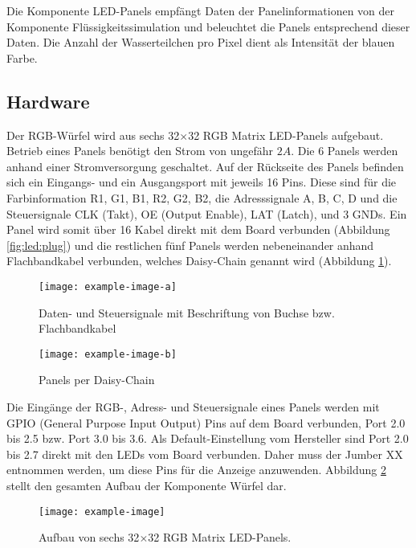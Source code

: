 Die Komponente LED-Panels empfängt Daten der Panelinformationen von der Komponente Flüssigkeitssimulation und beleuchtet die Panels entsprechend dieser Daten. Die Anzahl der Wasserteilchen pro Pixel dient als Intensität der blauen Farbe.

\subsection{Hardware}
Der RGB-Würfel wird aus sechs 32$\times$32 RGB Matrix LED-Panels aufgebaut. Betrieb eines Panels benötigt den Strom von ungefähr $2A$. Die 6 Panels werden anhand einer Stromversorgung geschaltet. Auf der Rückseite des Panels befinden sich ein Eingangs- und ein Ausgangsport mit jeweils 16 Pins. Diese sind für die Farbinformation R1, G1, B1, R2, G2, B2, die Adresssignale A, B, C, D und die Steuersignale CLK (Takt), OE (Output Enable), LAT (Latch), und 3 GNDs. Ein Panel wird somit über 16 Kabel direkt mit dem Board verbunden (Abbildung \ref{fig:led:plug}) und die restlichen fünf Panels werden nebeneinander anhand Flachbandkabel verbunden, welches Daisy-Chain genannt wird (Abbildung \ref{fig:led:chain}). 

\begin{figure}
	\centering
	\begin{minipage}[t]{0.45\linewidth}
	\texttt{[image: example-image-a]}
	\caption{Daten- und Steuersignale mit Beschriftung von Buchse bzw. Flachbandkabel}
	\label{fig:led:plug}
	\end{minipage}
	\hspace{0.05\linewidth}
	\begin{minipage}[t]{0.45\linewidth}
	\texttt{[image: example-image-b]}
	\caption{Panels per Daisy-Chain}
	\label{fig:led:chain}
	\end{minipage}
\end{figure}

Die Eingänge der RGB-, Adress- und Steuersignale eines Panels werden mit GPIO (General Purpose Input Output) Pins auf dem Board verbunden, Port 2.0 bis 2.5 bzw. Port 3.0 bis 3.6. Als Default-Einstellung vom Hersteller sind Port 2.0 bis 2.7 direkt mit den LEDs vom Board verbunden. Daher muss der Jumber XX entnommen werden, um diese Pins für die Anzeige anzuwenden. Abbildung \ref{fig:assembly:dice} stellt den gesamten Aufbau der Komponente Würfel dar.
\begin{figure}
	\centering
	\texttt{[image: example-image]}
	\caption[Aufbau von sechs 32$\times$32 RGB Matrix LED-Panels]{Aufbau von sechs 32$\times$32 RGB Matrix LED-Panels. }
	\label{fig:assembly:dice}
\end{figure}

